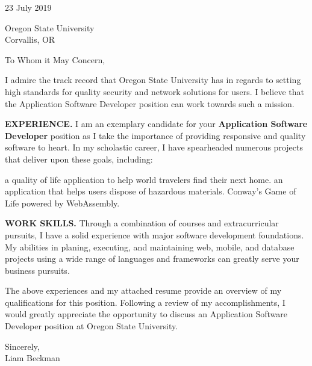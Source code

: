



\textcolor{my-grey}{\dotfill}
\bigbreak


23 July 2019\\
\bigbreak

Oregon State University\\
Corvallis, OR

\bigbreak

To Whom it May Concern,

\bigbreak

I admire the track record that Oregon State University has in regards to setting high standards for quality security and network solutions for users. I believe that the Application Software Developer position can work towards such a mission.

\bigbreak

\textbf{EXPERIENCE.} I am an exemplary candidate for your \textbf{Application Software Developer} position as I take the importance of providing responsive and quality software to heart. In my scholastic career, I have spearheaded numerous projects that deliver upon these goals, including:

\begin{itemize}[label=$\triangleright$]
    a quality of life application to help world travelers find their next home.
    an application that helps users dispose of hazardous materials.
    Conway's Game of Life powered by WebAssembly.
\end{itemize}

\bigbreak

\textbf{WORK SKILLS.} Through a combination of courses and extracurricular pursuits, I have a solid experience with major software development foundations. My abilities in planing, executing, and maintaining web, mobile, and database projects using a wide range of languages and frameworks can greatly serve your business pursuits.

\bigbreak

The above experiences and my attached resume provide an overview of my qualifications for this position. Following a review of my accomplishments, I would greatly appreciate the opportunity to discuss an Application Software Developer position at Oregon State University.

\bigbreak

Sincerely,\\

Liam Beckman

\vfill

\textcolor{my-grey}{\dotfill}
\medbreak



